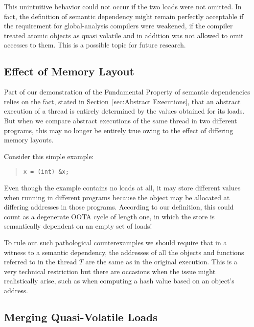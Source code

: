 This unintuitive behavior could not occur if the two loads were not
omitted.
In fact, the definition of semantic dependency might remain
perfectly acceptable if the requirement for global-analysis compilers
were weakened, if the compiler treated atomic objects as quasi
volatile and in addition was not allowed to omit accesses to them.
This is a possible topic for future research.

\subsection{Effect of Memory Layout}
\label{sec:Effect of Memory Layout}

Part of our demonstration of the Fundamental Property of semantic
dependencies relies on the fact, stated in
Section~\ref{sec:Abstract Executions},
that an abstract execution of a thread is entirely determined by the
values obtained for its loads.
But when we compare abstract executions of the same thread in two
different programs, this may no longer be entirely true owing to the
effect of differing memory layouts.

Consider this simple example:
\begin{quote}
\begin{verbatim}
x = (int) &x;
\end{verbatim}
\end{quote}
Even though the example contains no loads at all, it may store
different values when running in different programs because the
object  may be allocated at differing addresses in those
programs.
According to our definition, this could count as a degenerate OOTA
cycle of length one, in which the store is semantically dependent on
an empty set of loads!

To rule out such pathological counterexamples we should require that
in a witness to a semantic dependency, the addresses of all the
objects and functions referred to in the thread $T$ are the same as
in the original execution.
This is a very technical restriction but there are occasions when
the issue might realistically arise, such as when computing a hash
value based on an object's address.

\subsection{Merging Quasi-Volatile Loads}
\label{sec:Merging Quasi-Volatile Loads}

